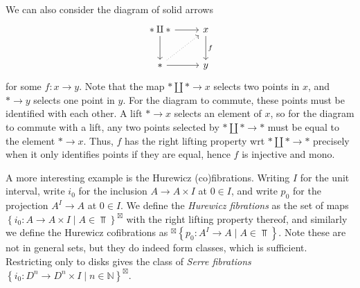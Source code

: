  We can also consider the diagram of solid arrows
 \[\begin{tikzcd}[row sep = 2.5em, column sep = 2.5em]
 *\amalg *\ar[r] \ar[d]  & x\ar[" f ", d]  \\
 *\ar[r] \ar[dotted, ur]  & y
 \end{tikzcd}\]
 for some $f : x \to y$. Note that the map $*\amalg *\to x$ selects two points in $x$, and $*\to y$ selects one point in $y$. For the diagram to commute, these points must be identified with each other. A lift $*\to x$ selects an element of $x$, so for the diagram to commute with a lift, any two points selected by $*\amalg *\to *$ must be equal to the element $*\to x$. Thus, $f$ has the right lifting property wrt $*\amalg *\to *$ precisely when it only identifies points if they are equal, hence $f$ is injective and mono.

 \begin{example}\label{2.1.1}
	 A more interesting example is the Hurewicz (co)fibrations. Writing $I$ for the unit interval, write $i_0$ for the inclusion $A\to A\times I$ at $0\in I$, and write $p_0$ for the projection $A^I\to A$ at $0\in I$. We define the \emph{Hurewicz fibrations} as the set of maps $\left\{ i_0 : A \to A\times I \mid A\in \Top  \right\}^{\boxtimes} $ with the right lifting property thereof, and similarly we define the Hurewicz cofibrations as ${}^{\boxtimes} \left\{ p_0 : A^I \to A\mid A\in \Top  \right\} $. Note these are not in general sets, but they do indeed form classes, which is sufficient. Restricting only to disks gives the class of \emph{Serre fibrations} $\left\{ i_0 : D^n \to D^n\times I\mid n\in\mathbb{N}  \right\}^{\boxtimes} $.
 \end{example}
 

